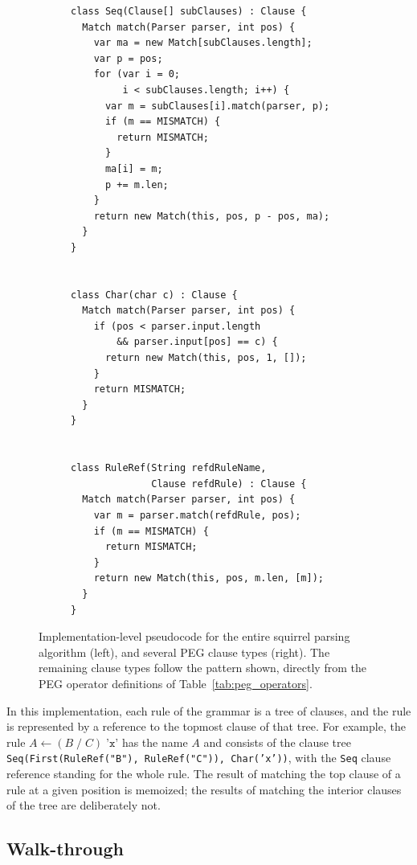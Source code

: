 \documentclass[manuscript]{acmart}
\newcommand{\cd}[1]{\texttt{#1}}
\begin{document}
\begin{figure}
\begin{subfigure}[t]{.46\linewidth}
\begin{lstlisting}[firstnumber=66]
class Seq(Clause[] subClauses) : Clause {
  Match match(Parser parser, int pos) {
    var ma = new Match[subClauses.length];
    var p = pos;
    for (var i = 0;
         i < subClauses.length; i++) {
      var m = subClauses[i].match(parser, p);
      if (m == MISMATCH) {
        return MISMATCH;
      }
      ma[i] = m;
      p += m.len;
    }
    return new Match(this, pos, p - pos, ma);
  }
}


class Char(char c) : Clause {
  Match match(Parser parser, int pos) {
    if (pos < parser.input.length
        && parser.input[pos] == c) {
      return new Match(this, pos, 1, []);
    }
    return MISMATCH;
  }
}


class RuleRef(String refdRuleName,
              Clause refdRule) : Clause {
  Match match(Parser parser, int pos) {
    var m = parser.match(refdRule, pos);
    if (m == MISMATCH) {
      return MISMATCH;
    }
    return new Match(this, pos, m.len, [m]);
  }
}
\end{lstlisting}
\end{subfigure}
\caption{Implementation-level pseudocode for the entire squirrel parsing algorithm (left), and several PEG clause types (right). The remaining clause types follow the pattern shown, directly from the PEG operator definitions of Table~\ref{tab:peg_operators}.}
\label{fig:Code}
\end{figure}

In this implementation, each rule of the grammar is a tree of clauses, and the rule is represented by a reference to the topmost clause of that tree. For example, the rule $A \leftarrow (B \; / \; C) \; \texttt{'x'}$ has the name $A$ and consists of the clause tree \cd{Seq(First(RuleRef("B"), RuleRef("C")), Char('x'))}, with the \cd{Seq} clause reference standing for the whole rule. The result of matching the top clause of a rule at a given position is memoized; the results of matching the interior clauses of the tree are deliberately not.

\subsection{Walk-through}
\label{sec:walkthrough}
\end{document}
